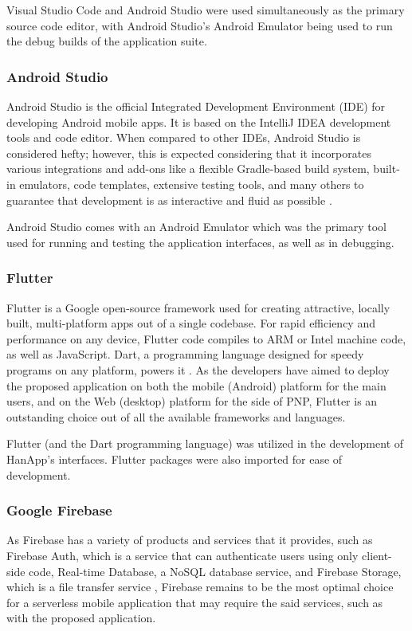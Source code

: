 Visual Studio Code and Android Studio were used simultaneously as the primary source code editor, with Android Studio's Android Emulator being used to run the debug builds of the application suite.  

\subsubsection{Android Studio}
Android Studio is the official Integrated Development Environment (IDE) for developing Android mobile apps. It is based on the IntelliJ IDEA development tools and code editor. When compared to other IDEs, Android Studio is considered hefty; however, this is expected considering that it incorporates various integrations and add-ons like a flexible Gradle-based build system, built-in emulators, code templates, extensive testing tools, and many others to guarantee that development is as interactive and fluid as possible \cite{androidStudio}.

Android Studio comes with an Android Emulator which was the primary tool used for running and testing the application interfaces, as well as in debugging.

\subsubsection{Flutter}
Flutter is a Google open-source framework used for creating attractive, locally built, multi-platform apps out of a single codebase. For rapid efficiency and performance on any device, Flutter code compiles to ARM or Intel machine code, as well as JavaScript. Dart, a programming language designed for speedy programs on any platform, powers it \cite{flutter}. As the developers have aimed to deploy the proposed application on both the mobile (Android) platform for the main users, and on the Web (desktop)  platform for the side of PNP, Flutter is an outstanding choice out of all the available frameworks and languages.

Flutter (and the Dart programming language) was utilized in the development of HanApp's interfaces. Flutter packages were also imported for ease of development.

\subsubsection{Google Firebase}
As Firebase has a variety of products and services that it provides, such as Firebase Auth, which is a service that can authenticate users using only client-side code, Real-time Database, a NoSQL database service, and Firebase Storage, which is a file transfer service \cite{khawas2018application}, Firebase remains to be the most optimal choice for a serverless mobile application that may require the said services, such as with the proposed application.

